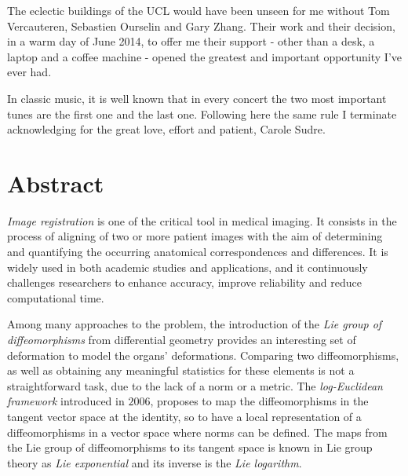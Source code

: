 The eclectic buildings of the UCL would have been unseen for me without Tom Vercauteren, Sebastien Ourselin and Gary Zhang. Their work and their decision, in a warm day of June 2014, to offer me their support - other than a desk, a laptop and a coffee machine - opened the greatest and important opportunity I've ever had.
 
In classic music, it is well known that in every concert the two most important tunes are the first one and the last one. Following here the same rule I terminate acknowledging for the great love, effort and patient, Carole Sudre.


\qquad
\pagestyle{empty}
\newpage


\section*{Abstract}

\emph{Image registration} is one of the critical tool in medical imaging. It consists in the process of aligning of two or more patient images with the aim of determining and quantifying the occurring anatomical correspondences and differences.
It is widely used in both academic studies and applications, and it continuously challenges researchers to enhance accuracy, improve reliability and reduce computational time.

Among many approaches to the problem, the introduction of the \emph{Lie group of diffeomorphisms} from differential geometry provides an interesting set of deformation to model the organs' deformations. Comparing two diffeomorphisms, as well as obtaining any meaningful statistics for these elements is not a straightforward task, due to the lack of a norm or a metric.
The \emph{log-Euclidean framework} introduced in $2006$, proposes to map the diffeomorphisms in the tangent vector space at the identity, so to have a local representation of a diffeomorphisms in a vector space where norms can be defined.
The maps from the Lie group of diffeomorphisms to its tangent space is known in Lie group theory as \emph{Lie exponential} and its inverse is the \emph{Lie logarithm}.

